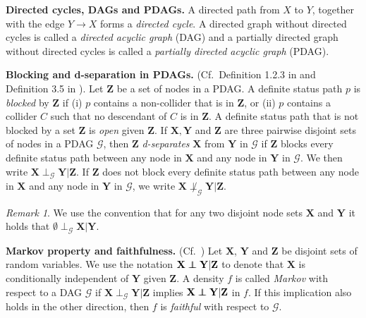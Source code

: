 \documentclass[11pt,a4paper]{article}
\theoremstyle{definition}
\theoremstyle{remark}
\newtheorem{Remark}[Satz]{Remark}
\newcommand\ci{\protect\mathpalette{\protect\independenT}{\perp}}
\def\independenT#1#2{\mathrel{\rlap{$#1#2$}\mkern2mu{#1#2}}}
\newcommand{\g}[1][G]{\mathcal{#1}}
\newcommand{\vsp}{\vspace{.2cm}}
\begin{document}
\vsp\noindent\textbf{Directed cycles, DAGs and PDAGs.} A directed path from $X$ to $Y$, together with the edge $Y\to X$ forms a \textit{directed cycle}. A directed graph without directed cycles is called a \textit{directed acyclic graph} (DAG) and a partially directed graph without directed cycles is called a \textit{partially directed acyclic graph} (PDAG). 

\vsp\noindent \textbf{Blocking and d-separation in PDAGs.} (Cf.\  Definition 1.2.3 in \cite{pearl2009causality} and Definition 3.5 in \cite{maathuis2013generalized}). Let $\mathbf{Z}$ be a set of nodes in a PDAG. A definite status path $p$ is  \textit{blocked} by $\mathbf{Z}$ if (i) $p$ contains a non-collider that is in $\mathbf{Z}$, or (ii) $p$ contains a collider $C$ such that no descendant of $C$ is in $\mathbf{Z}$.
A definite status path that is not blocked by a set $\mathbf{Z}$ is \textit{open} given $\mathbf{Z}$. If $\mathbf{X},\mathbf{Y}$ and $\mathbf{Z}$ are three pairwise disjoint sets of nodes in a PDAG $\g$, then $\mathbf{Z}$  \textit{d-separates} $\mathbf{X}$ from $\mathbf{Y}$ in $\g$ if $\mathbf{Z}$ blocks every definite status path between any node in $\mathbf{X}$ and any node in $\mathbf{Y}$ in $\g$. 
We then write $\mathbf{X} \perp_{\g} \mathbf{Y}|\mathbf{Z}$. If  $\mathbf{Z}$ does not block every definite status path between any node in $\mathbf{X}$ and any node in $\mathbf{Y}$ in $\g$, we write $\mathbf{X} \not\perp_{\g} \mathbf{Y}|\mathbf{Z}$. 

\begin{Remark}
	We use the convention that for any two disjoint node sets $\mathbf{X}$ and $\mathbf{Y}$ it holds that $\emptyset \perp_{\g} \mathbf{X} | \mathbf{Y}$.
\end{Remark}

\vsp\noindent\textbf{Markov property and faithfulness.} (Cf.\ \citep[Definition 1.2.2][]{pearl2009causality}) Let $\mathbf{X}$, $\mathbf{Y}$ and $\mathbf{Z}$ be disjoint sets of random variables. We use the notation $\mathbf{X} \ci \mathbf{Y}|\mathbf{Z}$ to denote that $\mathbf{X}$ is conditionally independent of $\mathbf{Y}$ given $\mathbf{Z}$. A density $f$ is called \emph{Markov} with respect to a DAG $\g$ if  $\mathbf{X} \perp_{\g} \mathbf{Y} | \mathbf{Z}$ implies $\mathbf{X} \ci \mathbf{Y} | \mathbf{Z}$ in $f$. If this implication also holds in the other direction, then $f$ is \emph{faithful} with respect to $\g$. 
\end{document}
